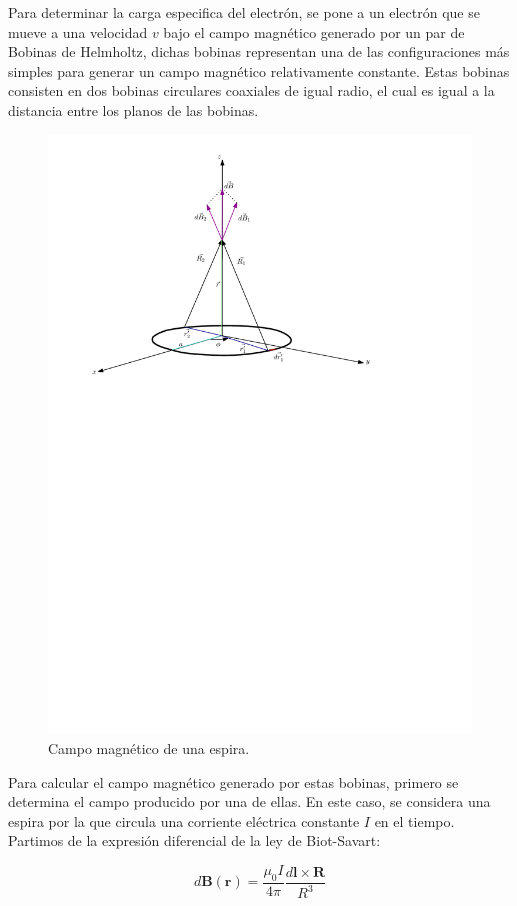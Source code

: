 Para determinar la carga especifica del electrón, se pone a un electrón que se
mueve a una velocidad $v$ bajo el campo magnético generado por un par de Bobinas
de Helmholtz, dichas bobinas representan una de las configuraciones más simples
para generar un campo magnético relativamente constante.
Estas bobinas consisten en dos bobinas circulares coaxiales de igual radio,
el cual es igual a la distancia entre los planos de las bobinas.

\begin{figure}[H]
  \centering
  \includegraphics[width=0.8\linewidth]{./images/loop-field.pdf}
  \caption{Campo magnético de una espira.}
  \label{fig:una_espira}
\end{figure}

Para calcular el campo magnético generado por estas bobinas, primero se
determina el campo producido por una de ellas.
En este caso, se considera una espira por la que circula una corriente eléctrica
constante $I$ en el tiempo.
Partimos de la expresión diferencial de la ley de Biot-Savart:

\begin{equation}\label{eq:Biot-Savart}
  d\mathbf{B}(\mathbf{r}) = \frac{\mu_0 I}{4 \pi} \frac{d\mathbf{l} \times \mathbf{R}}{R^{3}}
\end{equation}


